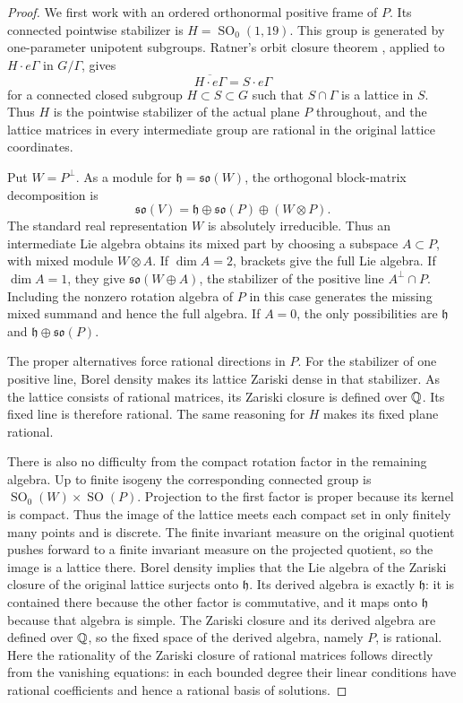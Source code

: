\begin{proof}
We first work with an ordered orthonormal positive frame of $P$.
Its connected pointwise stabilizer is
$H=\operatorname{SO}_0(1,19)$. This group is generated by
one-parameter unipotent subgroups. Ratner's orbit closure
theorem \cite{Ratner}, applied to $H\cdot e\Gamma$ in
$G/\Gamma$, gives
\[
 \overline{H\cdot e\Gamma}=S\cdot e\Gamma
\]
for a connected closed subgroup $H\subset S\subset G$ such
that $S\cap\Gamma$ is a lattice in $S$. Thus $H$ is the
pointwise stabilizer of the actual plane $P$ throughout, and the lattice
matrices in every intermediate group are rational in the
original lattice coordinates.

Put $W=P^\perp$. As a module for
$\mathfrak h=\mathfrak{so}(W)$, the orthogonal block-matrix
decomposition is
\[
 \mathfrak{so}(V)
 =\mathfrak h\oplus\mathfrak{so}(P)\oplus(W\otimes P).
\]
The standard real representation $W$ is absolutely irreducible.
Thus an intermediate Lie algebra obtains its mixed part by
choosing a subspace $A\subset P$, with mixed module $W\otimes A$.
If $\dim A=2$, brackets give the full Lie algebra. If
$\dim A=1$, they give
$\mathfrak{so}(W\oplus A)$, the stabilizer of the positive line
$A^\perp\cap P$. Including the nonzero rotation algebra of $P$
in this case generates the missing mixed summand and hence the
full algebra. If $A=0$, the only possibilities are
$\mathfrak h$ and
$\mathfrak h\oplus\mathfrak{so}(P)$.

The proper alternatives force rational directions in $P$.
For the stabilizer of one positive line, Borel density
\cite{BorelDensity} makes its lattice Zariski dense in that
stabilizer. As the lattice consists of rational matrices, its
Zariski closure is defined over $\mathbb Q$. Its fixed line is therefore
rational. The same reasoning for $H$ makes its fixed plane
rational.

There is also no difficulty from the compact rotation factor in
the remaining algebra. Up to finite isogeny the corresponding
connected group is
$\operatorname{SO}_0(W)\times\operatorname{SO}(P)$.
Projection to the first factor is proper because its kernel is
compact. Thus the image of the lattice meets each compact set
in only finitely many points and is discrete. The finite
invariant measure on the original quotient pushes forward to
a finite invariant measure on the projected quotient, so the
image is a lattice there. Borel density implies that the
Lie algebra of the Zariski closure of the original lattice
surjects onto $\mathfrak h$. Its derived algebra is exactly
$\mathfrak h$: it is contained there because the other factor
is commutative, and it maps onto $\mathfrak h$ because that
algebra is simple. The Zariski closure and its derived algebra
are defined over $\mathbb Q$, so the fixed space of the derived
algebra, namely $P$, is rational. Here the rationality of the
Zariski closure of rational matrices follows directly from the
vanishing equations: in each bounded degree their linear
conditions have rational coefficients and hence a rational
basis of solutions.


\end{proof}
